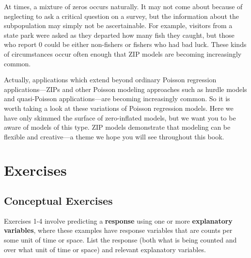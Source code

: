 \documentclass[
]{krantz}
\begin{document}
At times, a mixture of zeros occurs naturally. It may not come about because of neglecting to ask a critical question on a survey, but the information about the subpopulation may simply not be ascertainable. For example, visitors from a state park were asked as they departed how many fish they caught, but those who report 0 could be either non-fishers or fishers who had bad luck. These kinds of circumstances occur often enough that ZIP models are becoming increasingly common.

Actually, applications which extend beyond ordinary Poisson regression applications---ZIPs and other Poisson modeling approaches such as hurdle models and quasi-Poisson applications---are becoming increasingly common. So it is worth taking a look at these variations of Poisson regression models. Here we have only skimmed the surface of zero-inflated models, but we want you to be aware of models of this type. ZIP models demonstrate that modeling can be flexible and creative---a theme we hope you will see throughout this book.

\section{Exercises}\label{exercises-3}

\subsection{Conceptual Exercises}\label{exer:concept}

Exercises 1-4 involve predicting a \textbf{response} using one or more \textbf{explanatory variables}, where these examples have response variables that are counts per some unit of time or space. List the response (both what is being counted and over what unit of time or space) and relevant explanatory variables.
\end{document}
